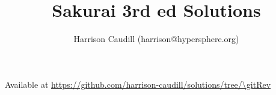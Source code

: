 \documentclass[
  fleqn,  %
  oneside %
]{book}
\title{Sakurai 3rd ed Solutions}
\author{Harrison Caudill (harrison@hypersphere.org)}
\date{}
\begin{document}
\frontmatter
\appendixCounters{}

\hypersetup{pageanchor=false}

\begin{titlepage}
    \centering%
    \vspace*{5cm}%
    {\Large \bfseries \thetitle \par}%
    \vspace{1.5cm}%
    {\large \theauthor \par}%
    \vfill%
    \doclicenseThis%
    \begin{flushleft}
      \raggedright
      \vspace{1em}
      \noindent\small
      Available at \url{https://github.com/harrison-caudill/solutions/tree/\gitRev}
    \end{flushleft}
\end{titlepage}

\hypersetup{pageanchor=true}



\graphicspath{{\buildPath/\bookName}}




\clearpage
{}
{}
\tableofcontents

\mainmatter

\problemCounters{}


\backmatter

\clearpage

\end{document}
